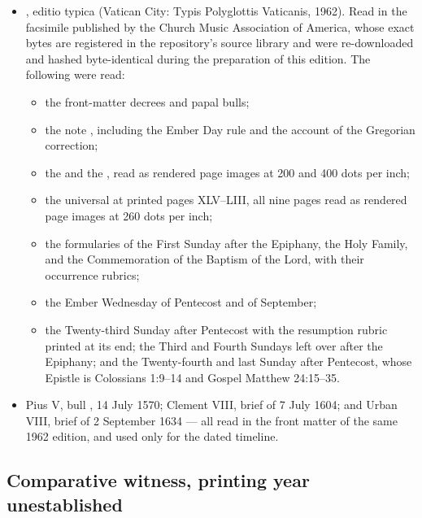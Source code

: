 \begin{itemize}[leftmargin=1.3em, itemsep=0.3em]
\item {}, editio typica (Vatican City: Typis Polyglottis Vaticanis, 1962).
Read in the facsimile published by the Church Music Association of America, whose exact bytes
are registered in the repository's source library and were re-downloaded and hashed
byte-identical during the preparation of this edition. The following were read:
\begin{itemize}[leftmargin=1.2em, itemsep=0.1em, topsep=0.15em]
\item the front-matter decrees and papal bulls;
\item the note , including the Ember Day rule and the account of
the Gregorian correction;
\item the  and the , read as rendered page images at 200 and 400 dots per inch;
\item the universal  at printed pages XLV--LIII, all nine pages read as
rendered page images at 260 dots per inch;
\item the formularies of the First Sunday after the Epiphany, the Holy Family, and the
Commemoration of the Baptism of the Lord, with their occurrence rubrics;
\item the Ember Wednesday of Pentecost and of September;
\item the Twenty-third Sunday after Pentecost with the resumption rubric printed at its end;
the Third and Fourth Sundays left over after the Epiphany; and the Twenty-fourth and last Sunday
after Pentecost, whose Epistle is Colossians 1:9--14 and Gospel Matthew 24:15--35.
\end{itemize}
\item Pius V, bull , 14 July 1570; Clement VIII, brief of 7 July 1604;
and Urban VIII, brief of 2 September 1634 — all read in the front matter of the same 1962
edition, and used only for the dated timeline.
\end{itemize}

\subsection{Comparative witness, printing year unestablished}

